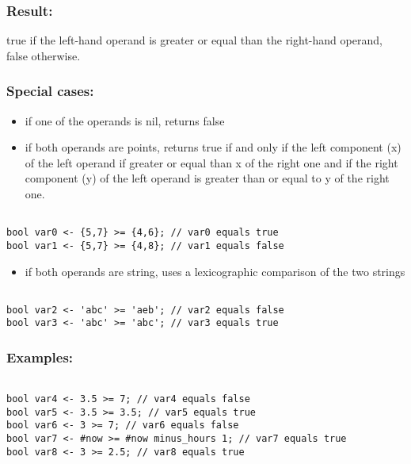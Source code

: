 \documentclass[]{book}
\providecommand{\tightlist}{%
  \setlength{\itemsep}{0pt}\setlength{\parskip}{0pt}}
\theoremstyle{definition}
\theoremstyle{definition}
\theoremstyle{definition}
\theoremstyle{remark}
\begin{document}
\subsubsection{Result:}\label{result-14}

true if the left-hand operand is greater or equal than the right-hand
operand, false otherwise.

\subsubsection{Special cases:}\label{special-cases-12}

\begin{itemize}
\tightlist
\item
  if one of the operands is nil, returns false\\
\item
  if both operands are points, returns true if and only if the left
  component (x) of the left operand if greater or equal than x of the
  right one and if the right component (y) of the left operand is
  greater than or equal to y of the right one.
\end{itemize}

\begin{verbatim}
 
bool var0 <- {5,7} >= {4,6}; // var0 equals true 
bool var1 <- {5,7} >= {4,8}; // var1 equals false
\end{verbatim}

\begin{itemize}
\tightlist
\item
  if both operands are string, uses a lexicographic comparison of the
  two strings
\end{itemize}

\begin{verbatim}
 
bool var2 <- 'abc' >= 'aeb'; // var2 equals false 
bool var3 <- 'abc' >= 'abc'; // var3 equals true
\end{verbatim}

\subsubsection{Examples:}\label{examples-11}

\begin{verbatim}
 
bool var4 <- 3.5 >= 7; // var4 equals false 
bool var5 <- 3.5 >= 3.5; // var5 equals true 
bool var6 <- 3 >= 7; // var6 equals false 
bool var7 <- #now >= #now minus_hours 1; // var7 equals true 
bool var8 <- 3 >= 2.5; // var8 equals true
\end{verbatim}
\end{document}

